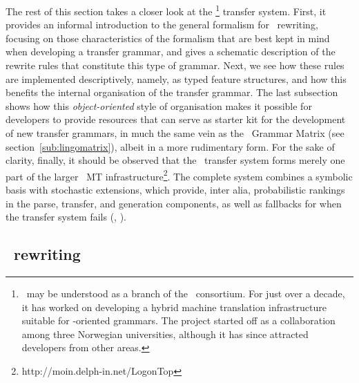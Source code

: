 The rest of this section takes a closer look at the \logon\footnote{\logon\ may
be understood as a branch of the \delphin\ consortium. For just over a decade,
it has worked on developing a hybrid machine translation infrastructure
suitable for \mrs-oriented grammars. The project started off as a collaboration
among three Norwegian universities, although it has since attracted developers
from other areas.} transfer system. First, it provides an informal introduction
to the general formalism for \mrs\ rewriting, focusing on those characteristics
of the formalism that are best kept in mind when developing a transfer grammar,
and gives a schematic description of the rewrite rules that constitute this
type of grammar. Next, we see how these rules are implemented descriptively,
namely, as typed feature structures, and how this benefits the internal
organisation of the transfer grammar. The last subsection shows how this
\emph{object-oriented} style of organisation makes it possible for developers
to provide resources that can serve as starter kit for the development of new
transfer grammars, in much the same vein as the \lingo\ Grammar Matrix (see
section~\ref{sub:lingomatrix}), albeit in a more rudimentary form. For the sake
of clarity, finally, it should be observed that the \logon\ transfer system
forms merely one part of the larger \logon\ MT
infrastructure\footnote{http://moin.delph-in.net/LogonTop}. The complete system
combines a symbolic basis with stochastic extensions, which provide, inter
alia, probabilistic rankings in the parse, transfer, and generation components,
as well as fallbacks for when the transfer system fails (\citet{bond2011deep},
\citet{Oepen02lingoredwoods}).


\subsection{\mrs\ rewriting}

